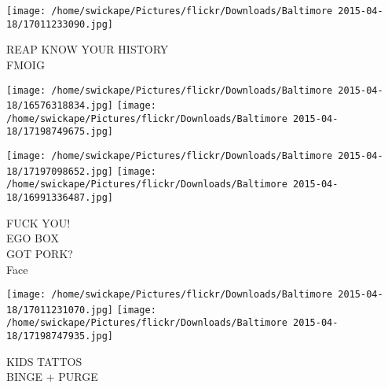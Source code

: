 \documentclass[10pt,letterpaper]{article}
\begin{document}
\vspace{0.25in}
\texttt{[image: /home/swickape/Pictures/flickr/Downloads/Baltimore 2015-04-18/17011233090.jpg]}

REAP KNOW YOUR HISTORY\\
FMOIG\\
\pagebreak

\texttt{[image: /home/swickape/Pictures/flickr/Downloads/Baltimore 2015-04-18/16576318834.jpg]}
\texttt{[image: /home/swickape/Pictures/flickr/Downloads/Baltimore 2015-04-18/17198749675.jpg]}

\texttt{[image: /home/swickape/Pictures/flickr/Downloads/Baltimore 2015-04-18/17197098652.jpg]}
\texttt{[image: /home/swickape/Pictures/flickr/Downloads/Baltimore 2015-04-18/16991336487.jpg]}

FUCK YOU!\\
EGO BOX\\
GOT PORK?\\
Face\\
\pagebreak

\texttt{[image: /home/swickape/Pictures/flickr/Downloads/Baltimore 2015-04-18/17011231070.jpg]}
\texttt{[image: /home/swickape/Pictures/flickr/Downloads/Baltimore 2015-04-18/17198747935.jpg]}

KIDS TATTOS\\
BINGE + PURGE\\
\pagebreak
\end{document}
